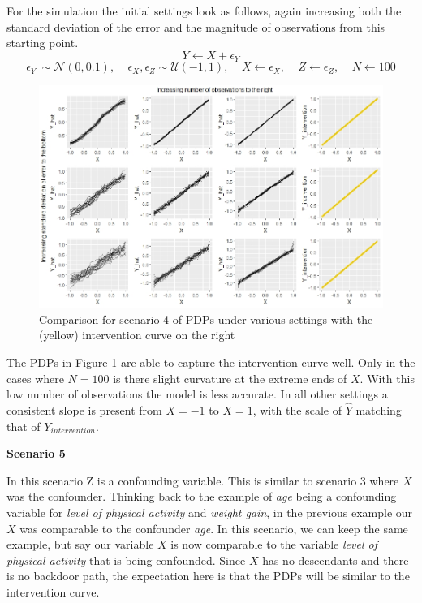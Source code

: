 \documentclass[
]{krantz}
\begin{document}
For the simulation the initial settings look as follows, again increasing both the standard deviation of the error and the magnitude of observations from this starting point.
\[ Y \leftarrow X + \epsilon_Y  \]
\[ \epsilon_Y ~ \sim \mathcal{N}(0, 0.1), \ \ \ \ \ \epsilon_X, \epsilon_Z \sim \mathcal{U}(-1,1), \ \ \ \ \ X \leftarrow \epsilon_X,\ \ \ \ \ Z \leftarrow \epsilon_Z, \ \ \ \ \ N \leftarrow 100 \]

\begin{figure}

\includegraphics[width=1\linewidth]{images/scenario4_all} \hfill{}

\caption{Comparison for scenario 4 of PDPs under various settings with the (yellow) intervention curve on the right}\label{fig:Figure10causal}
\end{figure}

The PDPs in Figure \ref{fig:Figure10causal} are able to capture the intervention curve well. Only in the cases where \(N=100\) is there slight curvature at the extreme ends of \(X\). With this low number of observations the model is less accurate. In all other settings a consistent slope is present from \(X = -1\) to \(X = 1\), with the scale of \(\hat{Y}\) matching that of \(Y_{intervention}\).

\textbf{Scenario 5}

In this scenario Z is a confounding variable. This is similar to scenario 3 where \(X\) was the confounder. Thinking back to the example of \emph{age} being a confounding variable for \emph{level of physical activity} and \emph{weight gain}, in the previous example our \(X\) was comparable to the confounder \emph{age}. In this scenario, we can keep the same example, but say our variable \(X\) is now comparable to the variable \emph{level of physical activity} that is being confounded. Since \(X\) has no descendants and there is no backdoor path, the expectation here is that the PDPs will be similar to the intervention curve.
\end{document}
